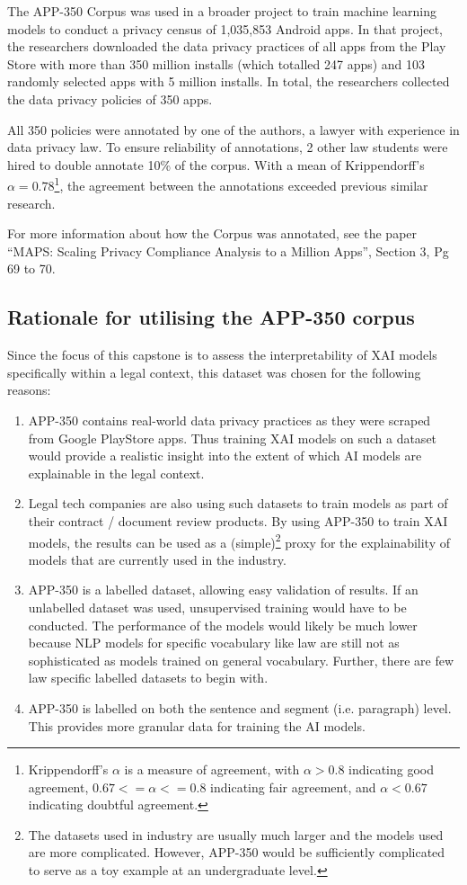 The APP-350 Corpus was used in a broader project to train machine learning models to conduct a privacy census of 1,035,853 Android apps. In that project, the researchers downloaded the data privacy practices of all apps from the Play Store with more than 350 million installs (which totalled 247 apps) and 103 randomly selected apps with 5 million installs. In total, the researchers collected the data privacy policies of 350 apps.

All 350 policies were annotated by one of the authors, a lawyer with experience in data privacy law. To ensure reliability of annotations, 2 other law students were hired to double annotate 10\% of the corpus. With a mean of Krippendorff's $\alpha = 0.78$\footnote{Krippendorff's $\alpha$ is a measure of agreement, with $\alpha > 0.8$ indicating good agreement, $0.67 <= \alpha <= 0.8$ indicating fair agreement, and $\alpha < 0.67$ indicating doubtful agreement.}, the agreement between the annotations exceeded previous similar research.

For more information about how the Corpus was annotated, see the paper “MAPS: Scaling Privacy Compliance Analysis to a Million Apps”, Section 3, Pg 69 to 70. 

\subsection{Rationale for utilising the APP-350 corpus}

Since the focus of this capstone is to assess the interpretability of XAI models specifically within a legal context, this dataset was chosen for the following reasons:

\begin{enumerate}
	\item APP-350 contains real-world data privacy practices as they were scraped from Google PlayStore apps. Thus training XAI models on such a dataset would provide a realistic insight into the extent of which AI models are explainable in the legal context.
	\item Legal tech companies are also using such datasets to train models as part of their contract / document review products. By using APP-350 to train XAI models, the results can be used as a (simple)\footnote{The datasets used in industry are usually much larger and the models used are more complicated. However, APP-350 would be sufficiently complicated to serve as a toy example at an undergraduate level.} proxy for the explainability of models that are currently used in the industry.
	\item APP-350 is a labelled dataset, allowing easy validation of results. If an unlabelled dataset was used, unsupervised training would have to be conducted. The performance of the models would likely be much lower because NLP models for specific vocabulary like law are still not as sophisticated as models trained on general vocabulary. Further, there are few law specific labelled datasets to begin with. 
	\item APP-350 is labelled on both the sentence and segment (i.e. paragraph) level. This provides more granular data for training the AI models. 
\end{enumerate}


